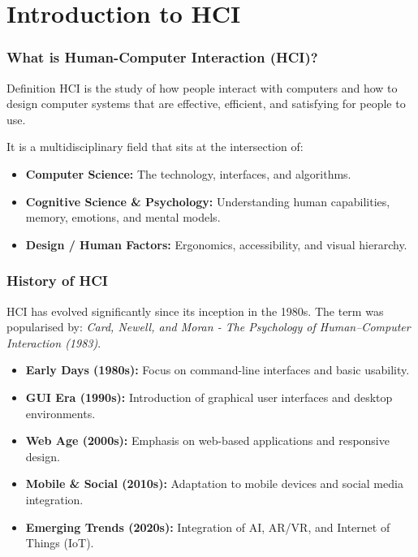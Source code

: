 \documentclass[xcolor=table]{beamer}
\begin{document}
\section{Introduction to HCI}

\begin{frame}
    \frametitle{What is Human-Computer Interaction (HCI)?}
    \begin{block}{Definition}
        HCI is the study of how people interact with computers and how to design computer systems that are effective, efficient, and satisfying for people to use.
    \end{block}
    
    \vspace{0.3cm}
    It is a multidisciplinary field that sits at the intersection of:
    \begin{itemize}
        \item \textbf{Computer Science:} The technology, interfaces, and algorithms.
        \item \textbf{Cognitive Science \& Psychology:} Understanding human capabilities, memory, emotions, and mental models.
        \item \textbf{Design / Human Factors:} Ergonomics, accessibility, and visual hierarchy.
    \end{itemize}
\end{frame}

\begin{frame}
    \frametitle{History of HCI}
    HCI has evolved significantly since its inception in the 1980s. The term was popularised by: \textit{Card, Newell, and Moran - The Psychology of Human–Computer Interaction (1983)}.
    
    \vspace{0.2cm}
    \begin{itemize}
        \item \textbf{Early Days (1980s):} Focus on command-line interfaces and basic usability.
        \item \textbf{GUI Era (1990s):} Introduction of graphical user interfaces and desktop environments.
        \item \textbf{Web Age (2000s):} Emphasis on web-based applications and responsive design.
        \item \textbf{Mobile \& Social (2010s):} Adaptation to mobile devices and social media integration.
        \item \textbf{Emerging Trends (2020s):} Integration of AI, AR/VR, and Internet of Things (IoT).
    \end{itemize}
\end{frame}
\end{document}

